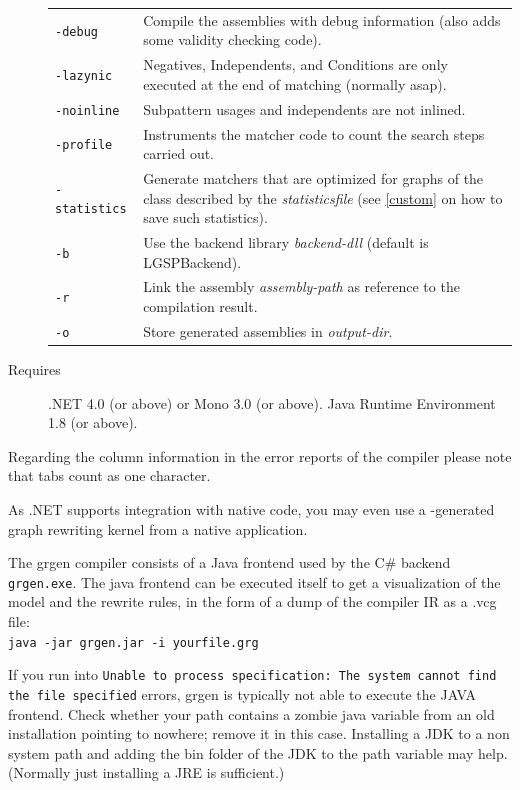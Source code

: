 \begin{description}
\begin{tabularx}{\linewidth}{lX}
      \texttt{-debug} & Compile the assemblies with debug information (also adds some validity checking code).\\
      \texttt{-lazynic} & Negatives, Independents, and Conditions are only executed at the end of matching (normally asap).\\
      \texttt{-noinline} & Subpattern usages and independents are not inlined.\\
      \texttt{-profile} & Instruments the matcher code to count the search steps carried out.\\
      \texttt{-statistics} & Generate matchers that are optimized for graphs of the class described by the \emph{statisticsfile} (see \ref{custom} on how to save such statistics).\\
      \texttt{-b} & Use the backend library \emph{backend-dll} (default is LGSPBackend).\\
      \texttt{-r} & Link the assembly \emph{assembly-path} as reference to the compilation result.\\
      \texttt{-o} & Store generated assemblies in \emph{output-dir}.
    \end{tabularx}
  \item[Requires] .NET 4.0 (or above) or Mono 3.0 (or above). Java Runtime Environment 1.8 (or above).
\end{description}

\begin{note}
Regarding the column information in the error reports of the compiler please note that tabs count as one character.
\end{note}

\begin{note}
As .NET supports integration with native code, you may even use a \GrG-generated graph rewriting kernel from a native application.
\end{note}

\begin{note}\label{note:modelruledump}
The grgen compiler consists of a Java frontend used by the C\# backend \texttt{grgen.exe}.
The java frontend can be executed itself to get a visualization of the model and the rewrite rules,
in the form of a dump of the compiler IR as a .vcg file:\\
\texttt{java -jar grgen.jar -i yourfile.grg}
\end{note}

\begin{note}
If you run into \texttt{Unable to process specification: The system cannot find the file specified} errors, 
grgen is typically not able to execute the JAVA frontend.
Check whether your path contains a zombie java variable from an old installation pointing to nowhere; remove it in this case.
Installing a JDK to a non system path and adding the bin folder of the JDK to the path variable may help.
(Normally just installing a JRE is sufficient.)
\end{note}

